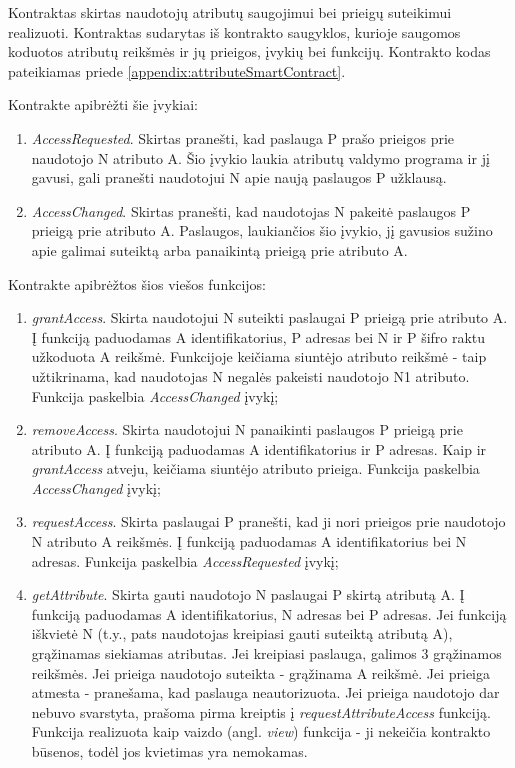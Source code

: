 Kontraktas skirtas naudotojų atributų saugojimui bei prieigų suteikimui realizuoti. Kontraktas sudarytas iš kontrakto saugyklos,
kurioje saugomos koduotos atributų reikšmės ir jų prieigos, įvykių bei funkcijų.
Kontrakto kodas pateikiamas priede \hypertarget{appendix:attributeSmartContract}{\ref{appendix:attributeSmartContract}}.

Kontrakte apibrėžti šie įvykiai:

\begin{enumerate}
    \item \textit{AccessRequested}. Skirtas pranešti, kad paslauga P prašo prieigos prie naudotojo N atributo A. Šio įvykio laukia
    atributų valdymo programa ir jį gavusi, gali pranešti naudotojui N apie naują paslaugos P užklausą.
    \item \textit{AccessChanged}. Skirtas pranešti, kad naudotojas N pakeitė paslaugos P prieigą prie atributo A. Paslaugos, 
    laukiančios šio įvykio, jį gavusios sužino apie galimai suteiktą arba panaikintą prieigą prie atributo A.
\end{enumerate}

Kontrakte apibrėžtos šios viešos funkcijos:

\begin{enumerate}
    \item \textit{grantAccess}. Skirta naudotojui N suteikti paslaugai P prieigą prie atributo A. Į funkciją paduodamas A identifikatorius,
    P adresas bei N ir P šifro raktu užkoduota A reikšmė. Funkcijoje keičiama siuntėjo atributo reikšmė - taip užtikrinama, kad naudotojas N
    negalės pakeisti naudotojo N1 atributo. Funkcija paskelbia \textit{AccessChanged} įvykį;
    \item \textit{removeAccess}. Skirta naudotojui N panaikinti paslaugos P prieigą prie atributo A. Į funkciją paduodamas A identifikatorius ir P
    adresas. Kaip ir \textit{grantAccess} atveju, keičiama siuntėjo atributo prieiga. Funkcija paskelbia \textit{AccessChanged} įvykį;
    \item \textit{requestAccess}. Skirta paslaugai P pranešti, kad ji nori prieigos prie naudotojo N atributo A reikšmės. Į funkciją paduodamas A identifikatorius
    bei N adresas. Funkcija paskelbia \textit{AccessRequested} įvykį;
    \item \textit{getAttribute}. Skirta gauti naudotojo N paslaugai P skirtą atributą A. Į funkciją paduodamas A identifikatorius, N adresas bei
    P adresas. Jei funkciją iškvietė N (t.y., pats naudotojas kreipiasi gauti suteiktą atributą A), grąžinamas siekiamas atributas. Jei kreipiasi paslauga,
    galimos 3 grąžinamos reikšmės. Jei prieiga naudotojo suteikta - grąžinama A reikšmė. Jei prieiga atmesta - pranešama, kad paslauga neautorizuota. Jei
    prieiga naudotojo dar nebuvo svarstyta, prašoma pirma kreiptis į \textit{requestAttributeAccess} funkciją.\\
    Funkcija realizuota kaip vaizdo (angl. \textit{view}) funkcija - ji nekeičia kontrakto būsenos, todėl jos kvietimas yra nemokamas.
\end{enumerate}

